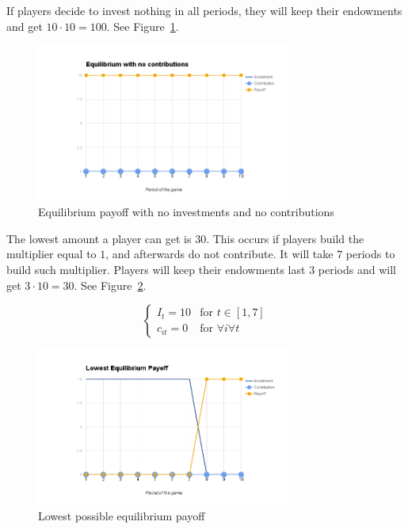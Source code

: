 			If players decide to invest nothing in all periods, they will keep their endowments and get $10 \cdot 10 = 100$. See Figure~\ref{fig:nash-nocontrib}.

			\begin{figure}
				\begin{center}
					\includegraphics[width=8.4cm]{resources/nash-nocontrib.png}
					\caption{Equilibrium payoff with no investments and no contributions} 
					\label{fig:nash-nocontrib}
				\end{center}
			\end{figure}

			The lowest amount a player can get is $30$. This occurs if players build the multiplier equal to $1$, and afterwards do not contribute. It will take $7$ periods to build such multiplier. Players will keep their endowments last $3$ periods and will get $3 \cdot 10 = 30$. See Figure~\ref{fig:nash-lowest}.

			\[
				\begin{cases}
					I_t = 10 	& \text{for } t \in [1, 7] \\
					c_{it} = 0	& \text{for } \forall i \forall t
				\end{cases}
			\]

			\begin{figure}
				\begin{center}
					\includegraphics[width=8.4cm]{resources/nash-lowest.png}
					\caption{Lowest possible equilibrium payoff} 
					\label{fig:nash-lowest}
				\end{center}
			\end{figure}

